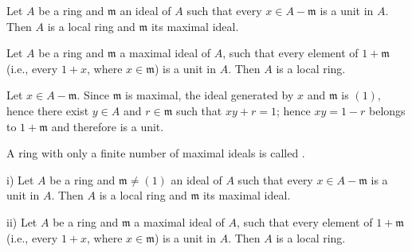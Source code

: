 
\begin{prop}
Let \( A \) be a ring and \( \mathfrak{m} \) an ideal of \( A \) such that every \( x \in A - \mathfrak{m} \) is a unit in \( A \). Then \( A \) is a local ring and \( \mathfrak{m} \) its maximal ideal.
\end{prop}

\begin{prop}
Let \( A \) be a ring and \( \mathfrak{m} \) a maximal ideal of \( A \), such that every element of \( 1 + \mathfrak{m} \) (i.e., every \( 1 + x \), where \( x \in \mathfrak{m} \)) is a unit in \( A \). Then \( A \) is a local ring.
\end{prop}

\begin{prop}
Let \( x \in A - \mathfrak{m} \). Since \( \mathfrak{m} \) is maximal, the ideal generated by \( x \) and \( \mathfrak{m} \) is \( (1) \), hence there exist \( y \in A \) and \( r \in \mathfrak{m} \) such that \( xy + r = 1 \); hence \( xy = 1 - r \) belongs to \( 1 + \mathfrak{m} \) and therefore is a unit.
\end{prop}

A ring with only a finite number of maximal ideals is called .

\begin{prop}
i) Let \( A \) be a ring and \( \mathfrak{m} \ne (1) \) an ideal of \( A \) such that every \( x \in A - \mathfrak{m} \) is a unit in \( A \). Then \( A \) is a local ring and \( \mathfrak{m} \) its maximal ideal.

ii) Let \( A \) be a ring and \( \mathfrak{m} \) a maximal ideal of \( A \), such that every element of \( 1 + \mathfrak{m} \) (i.e., every \( 1 + x \), where \( x \in \mathfrak{m} \)) is a unit in \( A \). Then \( A \) is a local ring.
\end{prop}

